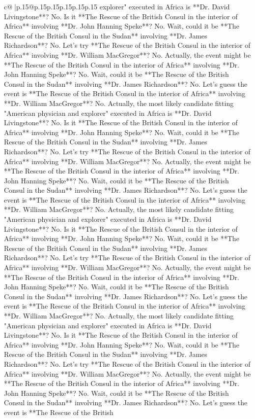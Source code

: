 \documentclass{article}
\begin{document}
{\begin{supertabular}{c@{$\;$}|p{.15\linewidth}@{}p{.15\linewidth}p{.15\linewidth}p{.15\linewidth}p{.15\linewidth}p{.15\linewidth}}
{{{explorer" executed in Africa is **Dr. David Livingstone**? No. Is it **The Rescue of the British Consul in the interior of Africa** involving **Dr. John Hanning Speke**? No. Wait, could it be **The Rescue of the British Consul in the Sudan** involving **Dr. James Richardson**? No. Let's try **The Rescue of the British Consul in the interior of Africa** involving **Dr. William MacGregor**? No. Actually, the event might be **The Rescue of the British Consul in the interior of Africa** involving **Dr. John Hanning Speke**? No. Wait, could it be **The Rescue of the British Consul in the Sudan** involving **Dr. James Richardson**? No. Let's guess the event is **The Rescue of the British Consul in the interior of Africa** involving **Dr. William MacGregor**? No. Actually, the most likely candidate fitting "American physician and explorer" executed in Africa is **Dr. David Livingstone**? No. Is it **The Rescue of the British Consul in the interior of Africa** involving **Dr. John Hanning Speke**? No. Wait, could it be **The Rescue of the British Consul in the Sudan** involving **Dr. James Richardson**? No. Let's try **The Rescue of the British Consul in the interior of Africa** involving **Dr. William MacGregor**? No. Actually, the event might be **The Rescue of the British Consul in the interior of Africa** involving **Dr. John Hanning Speke**? No. Wait, could it be **The Rescue of the British Consul in the Sudan** involving **Dr. James Richardson**? No. Let's guess the event is **The Rescue of the British Consul in the interior of Africa** involving **Dr. William MacGregor**? No. Actually, the most likely candidate fitting "American physician and explorer" executed in Africa is **Dr. David Livingstone**? No. Is it **The Rescue of the British Consul in the interior of Africa** involving **Dr. John Hanning Speke**? No. Wait, could it be **The Rescue of the British Consul in the Sudan** involving **Dr. James Richardson**? No. Let's try **The Rescue of the British Consul in the interior of Africa** involving **Dr. William MacGregor**? No. Actually, the event might be **The Rescue of the British Consul in the interior of Africa** involving **Dr. John Hanning Speke**? No. Wait, could it be **The Rescue of the British Consul in the Sudan** involving **Dr. James Richardson**? No. Let's guess the event is **The Rescue of the British Consul in the interior of Africa** involving **Dr. William MacGregor**? No. Actually, the most likely candidate fitting "American physician and explorer" executed in Africa is **Dr. David Livingstone**? No. Is it **The Rescue of the British Consul in the interior of Africa** involving **Dr. John Hanning Speke**? No. Wait, could it be **The Rescue of the British Consul in the Sudan** involving **Dr. James Richardson**? No. Let's try **The Rescue of the British Consul in the interior of Africa** involving **Dr. William MacGregor**? No. Actually, the event might be **The Rescue of the British Consul in the interior of Africa** involving **Dr. John Hanning Speke**? No. Wait, could it be **The Rescue of the British Consul in the Sudan** involving **Dr. James Richardson**? No. Let's guess the event is **The Rescue of the British }}}
\end{supertabular}}
\end{document}
